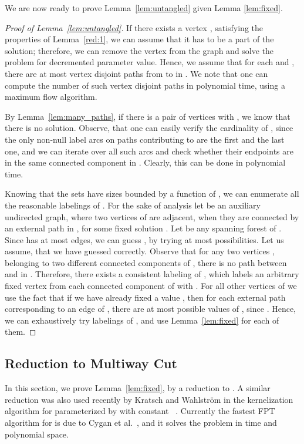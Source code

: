 \documentclass[11pt]{article}
\theoremstyle{definition}
\newcommand{\gfvs}{{\sc{Group Feedback Vertex Set}}\xspace}
\newcommand{\mwc}{{\sc{Multiway Cut}}\xspace}
\begin{document}
We are now ready to prove Lemma~\ref{lem:untangled} given Lemma \ref{lem:fixed}.

\begin{proof}[Proof of Lemma~\ref{lem:untangled}]
If there exists a vertex , satisfying the properties of Lemma~\ref{red:1},
we can assume that it has to be a part of the solution; therefore,
we can remove the vertex from the graph and solve the problem
for decremented parameter value.
Hence, we assume that for each  and ,
there are at most  vertex disjoint paths from  to  in .
We note that one can compute the number of such vertex disjoint paths in polynomial time, using 
a maximum flow algorithm.

By Lemma~\ref{lem:many_paths}, if there is a pair of vertices  with , 
we know that there is no solution.
Observe, that one can easily verify the cardinality of , since the only
non-null label arcs on paths contributing to  are the first and the last one,
and we can iterate over all such arcs and check whether their endpoints are in the same connected component in .
Clearly, this can be done in polynomial time.

Knowing that the sets  have sizes bounded by a function of ,
we can enumerate all the reasonable labelings of .
For the sake of analysis let  be an auxiliary undirected graph,
where two vertices of  are adjacent, when they are connected by an external path
in , for some fixed solution .
Let  be any spanning forest of .
Since  has at most  edges, we can guess ,
by trying at most  possibilities.
Let us assume, that we have guessed  correctly.
Observe that for any two vertices ,
belonging to two different connected components of ,
there is no path between  and  in .
Therefore, there exists a consistent labeling of ,
which labels an arbitrary fixed vertex from each connected component of  with .
For all other vertices of  we use the fact that if we have already fixed a value ,
then for each external path corresponding to an edge  of , there are at most  possible 
values of , since .
Hence, we can exhaustively try  labelings  of ,
and use Lemma~\ref{lem:fixed} for each of them.
\end{proof}

\subsection{Reduction to Multiway Cut}
\label{sec:alg:4}

In this section, we prove Lemma~\ref{lem:fixed},
by a reduction to \mwc.
A similar reduction was also used recently by Kratsch and Wahlstr\"om
in the kernelization algorithm for \gfvs parameterized by  with constant ~\cite{stefan:new}.
Currently the fastest FPT algorithm for \mwc is due to Cygan et al.~\cite{nmc:2k},
and it solves the problem in  time and polynomial space.
\end{document}
